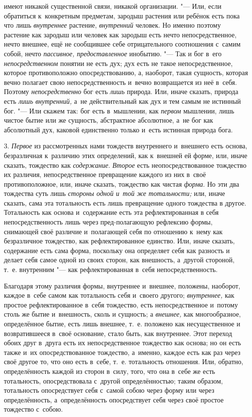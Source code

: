 имеют никакой существенной связи, никакой организации. "--- Или, если
обратиться к~конкретным предметам, зародыш растения или ребёнок есть пока
что лишь {\em внутреннее} растение,
{\em внутренний} человек. Но именно поэтому растение
как зародыш или человек как зародыш есть нечто непосредственное, нечто
внешнее, ещё не сообщившее себе отрицательного соотношения с~самим собой,
нечто {\em пассивное, предоставленное} инобытию. "--- Так
и бог в~его {\em непосредственном} понятии не есть дух;
дух есть не такое непосредственное, которое противоположно
опосредствованию, а, наоборот, такая сущность, которая вечно полагает свою
непосредственность и~вечно возвращается из неё в~себя. Поэтому
{\em непосредственно} бог есть
{\em лишь} природа. Или, иначе сказать, природа есть
{\em лишь внутренний,} а~не действительный как дух и
тем самым не истинный бог. "--- Или скажем так: бог есть в~мышлении, как
{\em первом} мышлении, лишь чистое бытие или же
сущность, абстрактное абсолютное, а~не бог как абсолютный дух, каковой
единственно только и~есть истинная природа бога.

3. {\em Первое} из рассмотренных нами тождеств
внутреннего и~внешнего есть основа, безразличная к~различию этих
определений, как к~внешней ей форме, или, иначе сказать, тождество как
{\em содержание}. {\em Второе} есть
неопосредствованное тождество их различия, непосредственное превращение
каждого из них в~своё противоположное, или, иначе сказать, тождество как
чистая {\em форма}. Но эти два тождества суть лишь
{\em стороны одной и~той же тотальности;} или, иначе
сказать, сама эта тотальность есть лишь превращение одного тождества в
другое. Тотальность как основа и~содержание есть эта рефлектированная в
себя непосредственность лишь через пред-полагающую рефлексию формы,
снимающей своё различие и~полагающей себя по отношению к~нему как
безразличное тождество, как рефлектированное единство. Или, иначе сказать,
содержание есть сама форма, поскольку она определяет себя как разность и
делает себя самое одной из своих сторон, как внешность, а~другой стороной,
т.~е. внутренним "--- как рефлектированная в~себя непосредственность.

Благодаря этому различия формы, внутреннее и~внешнее, положены, наоборот,
каждое в~себе самом как тотальность себя и~своего другого;
{\em внутреннее,} как простое рефлектированное в~себя
тождество, есть непосредственное и~потому столь же бытие и~внешность, сколь
и сущность; а {\em внешнее,} как многообразное,
определённое бытие, есть лишь внешнее, т.~е. положено как несущественное и
возвратившееся в~своё основание, стало быть, как внутреннее. Этот переход
обоих друг в~друга есть их непосредственное тождество как основа; но он
есть также и~их опосредствованное тождество, а~именно, каждое есть как раз
через своё другое то, что оно есть в~себе, т.~е. тотальность отношения.
Или, обратно, определённость каждой из сторон в~силу, того, что она в~себе
же есть тотальность, опосредствовала с~другой определённостью; таким
образом, тотальность опосредствует себя с~самой собою через форму или через
определённость, а~определённость опосредствует себя через своё простое
тождество с~собою.

